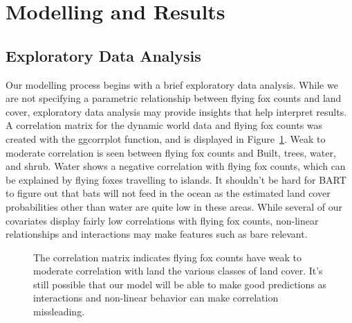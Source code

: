 \documentclass[
  12pt,
  letterpaper,
  DIV=11,
  numbers=noendperiod]{scrartcl}
\begin{document}
\section{Modelling and Results}\label{modelling-and-results}

\subsection{Exploratory Data Analysis}\label{exploratory-data-analysis}

Our modelling process begins with a brief exploratory data analysis.
While we are not specifying a parametric relationship between flying fox
counts and land cover, exploratory data analysis may provide insights
that help interpret results. A correlation matrix for the dynamic world
data and flying fox counts was created with the ggcorrplot function,
\citep{catstat2} and is displayed in Figure~\ref{fig-cor_mat}. Weak to
moderate correlation is seen between flying fox counts and Built, trees,
water, and shrub. Water shows a negative correlation with flying fox
counts, which can be explained by flying foxes travelling to islands. It
shouldn't be hard for BART to figure out that bats will not feed in the
ocean as the estimated land cover probabilities other than water are
quite low in these areas. While several of our covariates display fairly
low correlations with flying fox counts, non-linear relationships and
interactions may make features such as bare relevant.

\begin{figure}[H]


\caption{\label{fig-cor_mat}The correlation matrix indicates flying fox
counts have weak to moderate correlation with land the various classes
of land cover. It's still possible that our model will be able to make
good predictions as interactions and non-linear behavior can make
correlation missleading.}

\end{figure}%
\end{document}
